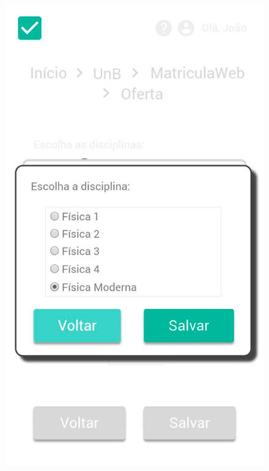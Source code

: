 \begin{figure}[h!]
{      \includegraphics[keepaspectratio=true, scale=0.2]{figuras/mob26.png}
   }
    
\end{figure}

